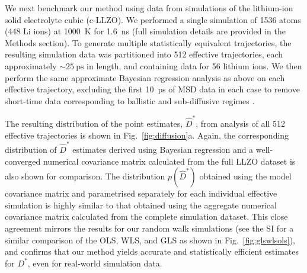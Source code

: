 \documentclass[reprint,superscriptaddress,nobibnotes,amsmath,amssymb,aps,prx,hidelinks,linenumbers]{revtex4-2}
\newcommand{\prob}[1]{\ensuremath{p(#1)}}
\newcommand{\Dest}{\ensuremath{\widehat{D}^*}}
\newcommand{\D}{\ensuremath{D^*}}
\newcommand{\var}[1]{\ensuremath{\sigma^2[#1]}}
\newcommand{\varest}[1]{\ensuremath{\widehat{\sigma}^2[#1]}}
\begin{document}
We next benchmark our method using data from simulations of the lithium-ion solid electrolyte cubic  (c-LLZO).
We performed a single simulation of \num{1536} atoms (\num{448} Li ions) at \SI{1000}{K} for \SI{1.6}{\nano\second} (full simulation details are provided in the Methods section).
To generate multiple statistically equivalent trajectories, the resulting simulation data was partitioned into \num{512} effective trajectories, each approximately $\sim\SI{25}{\ps}$ in length, and containing data for \num{56} lithium ions.
We then perform the same approximate Bayesian regression analysis as above on each effective trajectory, excluding the first \SI{10}{ps} of MSD data in each case to remove short-time data corresponding to ballistic and sub-diffusive regimes \cite{he_statistical_2018}.

The resulting distribution of the point estimates, $\Dest$, from analysis of all \num{512} effective trajectories is shown in Fig.~\ref{fig:diffusion}a.
Again, the corresponding distribution of $\Dest$ estimates derived using Bayesian regression and a well-converged numerical covariance matrix calculated from the full LLZO dataset is also shown for comparison.
The distribution $\prob{\Dest}$ obtained using the model covariance matrix and parametrised separately for each individual effective simulation is highly similar to that obtained using the aggregate numerical covariance matrix calculated from the complete simulation dataset.
This close agreement mirrors the results for our random walk simulations (see the SI for a similar comparison of the OLS, WLS, and GLS as shown in Fig.~\ref{fig:glswlsols}), and confirms that our method yields accurate and statistically efficient estimates for $\D$, even for real-world simulation data.

\end{document}

